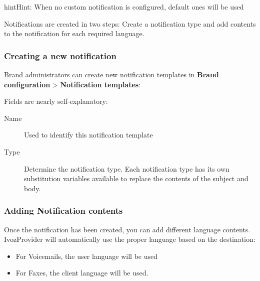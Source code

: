 \documentclass[letterpaper,10pt,english]{sphinxmanual}
\begin{document}
\begin{notice}{hint}{Hint:}
When no custom notification is configured, default ones will be used
\end{notice}

Notifications are created in two steps: Create a notification type and add contents to the notification for each
required language.


\subsubsection{Creating a new notification}
\label{administration_portal/brand/settings/notification_templates:creating-a-new-notification}
Brand administrators can create new notification templates in \textbf{Brand configuration} \textgreater{} \textbf{Notification templates}:

Fields are nearly self-explanatory:
\begin{description}
\item[{Name}] \leavevmode{}\label{administration_portal/brand/settings/notification_templates:term-name}
Used to identify this notification template

\item[{Type}] \leavevmode{}\label{administration_portal/brand/settings/notification_templates:term-type}
Determine the notification type. Each notification type has its own substitution variables available to replace
the contents of the subject and body.

\end{description}


\subsubsection{Adding Notification contents}
\label{administration_portal/brand/settings/notification_templates:adding-notification-contents}
Once the notification has been created, you can add different language contents. IvozProvider will automatically use
the proper language based on the destination:
\begin{itemize}
\item {} 
For Voicemails, the user language will be used

\item {} 
For Faxes, the client language will be used.

\end{itemize}
\end{document}
